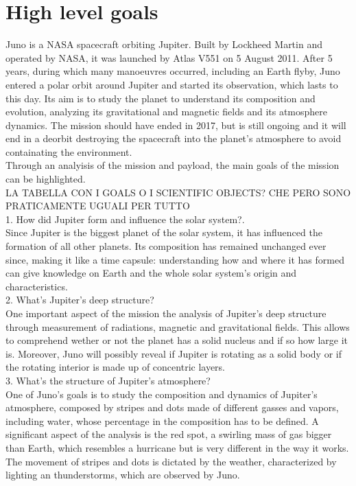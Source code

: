 \section{High level goals}
\label{sec:goals}
Juno is a NASA spacecraft orbiting Jupiter. Built by Lockheed Martin and operated by NASA, it was launched by Atlas V551 on 5 August 2011. After 5 years, during which many manoeuvres occurred, including an Earth flyby, Juno entered a polar orbit around Jupiter and started its observation, which lasts to this day. Its aim is to study the planet to understand its composition and evolution, analyzing its gravitational and magnetic fields and its atmosphere dynamics. The mission should have ended in 2017, but is still ongoing and it will end in a deorbit destroying the spacecraft into the planet's atmosphere to avoid containating the environment. 
\\   

Through an analyisis of the mission and payload, the main goals of the mission can be highlighted. \\


LA TABELLA CON I GOALS O I SCIENTIFIC OBJECTS? CHE PERO SONO PRATICAMENTE UGUALI PER TUTTO \\

1. How did Jupiter form and influence the solar system?. \\
Since Jupiter is the biggest planet of the solar system, it has influenced the formation of all other planets. Its composition has remained unchanged ever since, making it like a time capsule: understanding how and where it has formed can give knowledge on Earth and the whole solar system’s origin and characteristics. \\




2. What's Jupiter's deep structure?\\
One important aspect of the mission the analysis of Jupiter's deep structure through measurement of radiations, magnetic and gravitational fields. This allows to comprehend wether or not the planet has a solid nucleus and if so how large it is. Moreover, Juno will possibly reveal if Jupiter is rotating as a solid body or if the rotating interior is made up of concentric layers.\\

3. What's the structure of Jupiter's atmosphere?\\
One of Juno's goals is to study the composition and dynamics of Jupiter's atmosphere, composed by stripes and dots made of different gasses and vapors, including water, whose percentage in the composition has to be defined. A significant aspect of the analysis is the red spot, a swirling mass of gas bigger than Earth, which resembles a hurricane but is very different in the way it works. The movement of stripes and dots is dictated by the weather, characterized by lighting an thunderstorms, which are observed by Juno. \\

